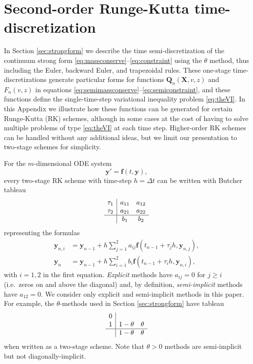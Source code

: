 \documentclass[final,leqno,onefignum,onetabnum]{siamltex1213bueler}
\newcommand\bbf{\mathbf{f}}
\newcommand\by{\mathbf{y}}
\newcommand\bQ{\mathbf{Q}}
\newcommand\bX{\mathbf{X}}
\begin{document}
\section{Second-order Runge-Kutta time-discretization}   In Section \ref{sec:strongform} we describe the time semi-discretization of the continuum strong form \eqref{eq:massconserve}--\eqref{eq:constraint} using the $\theta$ method, thus including the Euler, backward Euler, and trapezoidal rules.  These one-stage time-discretizations generate particular forms for functions $\bQ_n(\bX,v,z)$ and $F_n(v,z)$ in equations \eqref{eq:semimassconserve}--\eqref{eq:semiconstraint}, and these functions define the single-time-step variational inequality problem \eqref{eq:theVI}.  In this Appendix we illustrate how these functions can be generated for certain Runge-Kutta (RK) schemes, although in some cases at the cost of having to solve multiple problems of type \eqref{eq:theVI} at each time step.  Higher-order RK schemes can be handled without any additional ideas, but we limit our presentation to two-stage schemes for simplicity.

For the $m$-dimensional ODE system
\begin{equation}
  \by' = \bbf(t,\by),  \label{eq:abstractODE}
\end{equation}
every two-stage RK scheme with time-step $h=\Delta t$ can be written with Butcher tableau \cite{AscherPetzold}
\begin{equation}
\begin{array}{c|cc}
\tau_1 & a_{11} & a_{12}  \\
\tau_2 & a_{21} & a_{22}  \\ \hline
       & b_1    & b_2     \\
\end{array}  \label{eq:tableau}
\end{equation}
representing the formulas
\begin{align*}
  \by_{n,i} &= \by_{n-1} + h \sum_{j=1}^2 a_{ij} \bbf(t_{n-1} + \tau_j h, \by_{n,j}), \\
      \by_n &= \by_{n-1} + h \sum_{i=1}^2 b_i \bbf(t_{n-1} + \tau_i h, \by_{n,i}),
\end{align*}
with $i=1,2$ in the first equation.  \emph{Explicit} methods have $a_{ij}=0$ for $j\ge i$ (i.e.~zeros on and above the diagonal) and, by definition, \emph{semi-implicit} methods have $a_{12}=0$.  We consider only explicit and semi-implicit methods in this paper.  For example, the $\theta$-methods used in Section \ref{sec:strongform} have tableau
\begin{equation*}
\begin{array}{c|cc}
0 &          &   \\
1 & 1-\theta & \theta  \\ \hline
  & 1-\theta & \theta  \\
\end{array}
\end{equation*}
when written as a two-stage scheme.  Note that $\theta>0$ methods are semi-implicit but not diagonally-implicit.
\end{document}
